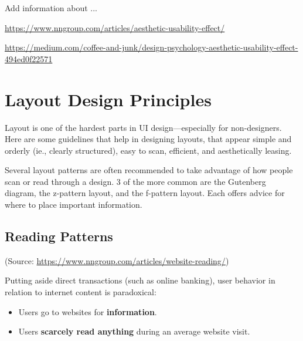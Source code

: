 \begin{tcolorbox}[
	width=\textwidth,
	title={\textbf{Excursus: What is the Aesthetic-Usability Effect?}},
	outer arc=0mm,
	arc=0mm,
	boxrule=1pt,
	]    
Add information about ...
\par \url{https://www.nngroup.com/articles/aesthetic-usability-effect/} 
\par \url{https://medium.com/coffee-and-junk/design-psychology-aesthetic-usability-effect-494ed0f22571}
\end{tcolorbox}

\label{sec:design_guidelines}

\section{Layout Design Principles} %
\label{sub:layout_design_principles}
Layout is one of the hardest parts in UI design---especially for non-designers.
Here are some guidelines that help in designing layouts, that appear simple and orderly (ie., clearly structured), easy to scan, efficient, and aesthetically leasing.

Several layout patterns are often recommended to take advantage of how people scan or read through a design. 3 of the more common are the Gutenberg diagram, the z-pattern layout, and the f-pattern layout. Each offers advice for where to place important information.



\subsection{Reading Patterns} %
\label{sub:reading_patterns}
(Source: \url{https://www.nngroup.com/articles/website-reading/})

Putting aside direct transactions (such as online banking), user behavior in relation to internet content is paradoxical:
\begin{itemize}[--->]
	\item Users go to websites for \textbf{information}.
	\item Users \textbf{scarcely read anything} during an average website visit.
\end{itemize}

